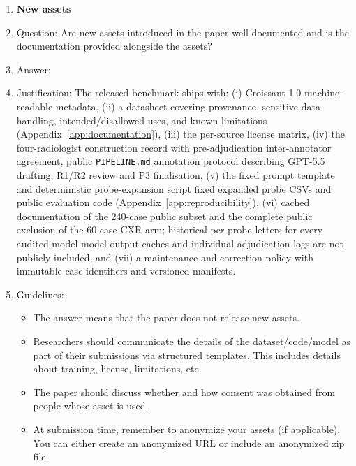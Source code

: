 \documentclass{article}
\providecommand{\DIFaddtex}[1]{{\protect\color{blue} \sf #1}} %
\providecommand{\DIFdeltex}[1]{{\protect\color{red} \scriptsize #1}} %
\providecommand{\DIFaddbegin}{} %
\providecommand{\DIFaddend}{} %
\providecommand{\DIFdelbegin}{} %
\providecommand{\DIFdelend}{} %
\providecommand{\DIFadd}[1]{\texorpdfstring{\DIFaddtex{#1}}{#1}} %
\providecommand{\DIFdel}[1]{\texorpdfstring{\DIFdeltex{#1}}{}} %
\begin{document}
\begin{enumerate}
\item {\bf New assets}
    \item[] Question: Are new assets introduced in the paper well documented and is the documentation provided alongside the assets?
    \item[] Answer: \answerYes{}
    \item[] Justification: The released benchmark ships with: (i) Croissant 1.0 machine-readable metadata, (ii) a datasheet covering provenance, sensitive-data handling, intended/disallowed uses, and known limitations (Appendix~\ref{app:documentation}), (iii) the per-source license matrix, (iv) the \DIFdelbegin \DIFdel{four-radiologist construction record with pre-adjudication inter-annotator agreement, }\DIFdelend \DIFaddbegin \DIFadd{public \texttt{PIPELINE.md} annotation protocol describing GPT-5.5 drafting, R1/R2 review and P3 finalisation, }\DIFaddend (v) \DIFdelbegin \DIFdel{the fixed prompt template and deterministic probe-expansion script }\DIFdelend \DIFaddbegin \DIFadd{fixed expanded probe CSVs and public evaluation code }\DIFaddend (Appendix~\ref{app:reproducibility}), (vi) \DIFdelbegin \DIFdel{cached }\DIFdelend \DIFaddbegin \DIFadd{documentation of the 240-case public subset and the complete public exclusion of the 60-case CXR arm; historical }\DIFaddend per-probe \DIFdelbegin \DIFdel{letters for every audited model}\DIFdelend \DIFaddbegin \DIFadd{model-output caches and individual adjudication logs are not publicly included}\DIFaddend , and (vii) a maintenance and correction policy with immutable case identifiers and versioned manifests.
    \item[] Guidelines:
    \begin{itemize}
        \item The answer \answerNA{} means that the paper does not release new assets.
        \item Researchers should communicate the details of the dataset\slash code\slash model as part of their submissions via structured templates. This includes details about training, license, limitations, etc.
        \item The paper should discuss whether and how consent was obtained from people whose asset is used.
        \item At submission time, remember to anonymize your assets (if applicable). You can either create an anonymized URL or include an anonymized zip file.
    \end{itemize}


\end{enumerate}
\end{document}
